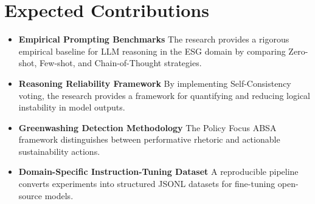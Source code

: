\documentclass{article}
\begin{document}
\section{Expected Contributions}
\begin{itemize}
\item \textbf{Empirical Prompting Benchmarks} The research provides a rigorous empirical baseline for LLM reasoning in the ESG domain by comparing Zero-shot, Few-shot, and Chain-of-Thought strategies.
\item \textbf{Reasoning Reliability Framework} By implementing Self-Consistency voting, the research provides a framework for quantifying and reducing logical instability in model outputs.
\item \textbf{Greenwashing Detection Methodology} The Policy Focus ABSA framework distinguishes between performative rhetoric and actionable sustainability actions.
\item \textbf{Domain-Specific Instruction-Tuning Dataset} A reproducible pipeline converts experiments into structured JSONL datasets for fine-tuning open-source models.
\end{itemize}
\end{document}
